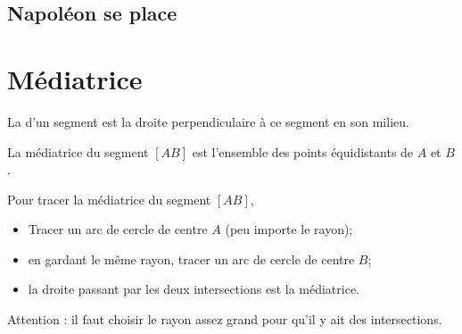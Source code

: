 
\subsection*{Napoléon se place}



\section{Médiatrice}

\begin{definition}
    La  d'un segment est la droite perpendiculaire à ce segment en son milieu.
\end{definition}

\begin{center}
   
\end{center}

\begin{Aretenir}
    La médiatrice du segment \( [AB]\) est l'ensemble des points équidistants de \( A\) et \( B\).
\end{Aretenir}

Pour tracer la médiatrice du segment \( [AB]\), 
\begin{itemize}
    \item Tracer un arc de cercle de centre \( A\) (peu importe le rayon);
    \item en gardant le même rayon, tracer un arc de cercle de centre \( B\);
    \item la droite passant par les deux intersections est la médiatrice.
\end{itemize}
Attention : il faut choisir le rayon assez grand pour qu'il y ait des intersections.

\begin{center}
   
\end{center}

